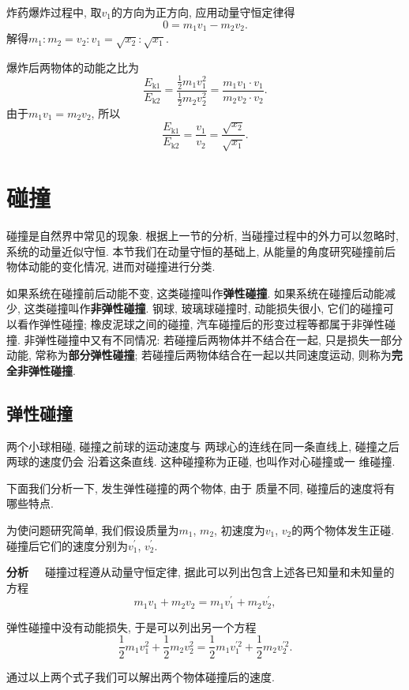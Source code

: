 \documentclass[11pt,a4paper]{ctexbook}
\newcommand{\bre}{\ \ \ }
\begin{document}
炸药爆炸过程中, 取$v_1$的方向为正方向, 应用动量守恒定律得
$$0 = m_1v_1 - m_2v_2.$$
解得$m_1: m_2 = v_2: v_1 = \sqrt{x_2}: \sqrt{x_1}$.

爆炸后两物体的动能之比为
$$\frac{E_\mathrm{k1}}{E_\mathrm{k2}} = \frac{\frac12 m_1v_1^2}{\frac12m_2v_2^2}=\frac{m_1v_1\cdot v_1}{m_2v_2\cdot v_2}.$$
由于$m_1v_1 = m_2v_2$, 所以$$\frac{E_\mathrm{k1}}{E_\mathrm{k2}} =\frac{v_1}{v_2} = \frac{\sqrt{x_2}}{\sqrt{x_1}}.$$

\section{碰撞}

碰撞是自然界中常见的现象. 根据上一节的分析, 当碰撞过程中的外力可以忽略时, 系统的动量近似守恒.
本节我们在动量守恒的基础上, 从能量的角度研究碰撞前后物体动能的变化情况, 进而对碰撞进行分类.

如果系统在碰撞前后动能不变, 这类碰撞叫作\textbf{弹性碰撞}.
如果系统在碰撞后动能减少, 这类碰撞叫作\textbf{非弹性碰撞}.
钢球, 玻璃球碰撞时, 动能损失很小, 它们的碰撞可
以看作弹性碰撞; 橡皮泥球之间的碰撞, 汽车碰撞后的形变过程等都属于非弹性碰撞.
非弹性碰撞中又有不同情况: 若碰撞后两物体并不结合在一起, 只是损失一部分动能, 常称为\textbf{部分弹性碰撞}; 若碰撞后两物体结合在一起以共同速度运动, 则称为\textbf{完全非弹性碰撞}.

\subsection{弹性碰撞}

两个小球相碰, 碰撞之前球的运动速度与
两球心的连线在同一条直线上, 碰撞之后两球的速度仍会
沿着这条直线. 这种碰撞称为正碰, 也叫作对心碰撞或一
维碰撞.

下面我们分析一下, 发生弹性碰撞的两个物体, 由于
质量不同, 碰撞后的速度将有哪些特点.

为使问题研究简单, 我们假设质量为$m_1$, $m_2$, 初速度为$v_1$, $v_2$的两个物体发生正碰.
碰撞后它们的速度分别为$v_1^{\prime}$, $v_2^{\prime}$.

\textbf{分析}\bre 碰撞过程遵从动量守恒定律, 据此可以列出包含上述各已知量和未知量的方程
$$m_1v_1 + m_2v_2 = m_1v_1^{\prime} + m_2v_2^{\prime}, $$

弹性碰撞中没有动能损失, 于是可以列出另一个方程
$$\displaystyle\frac12 m_1 v_1^2 + \displaystyle\frac12 m_2 v_2^2 = \displaystyle\frac12 m_1 v_1^{\prime 2} + \displaystyle\frac12 m_2 v_2^{\prime 2}.$$

通过以上两个式子我们可以解出两个物体碰撞后的速度.
\end{document}
